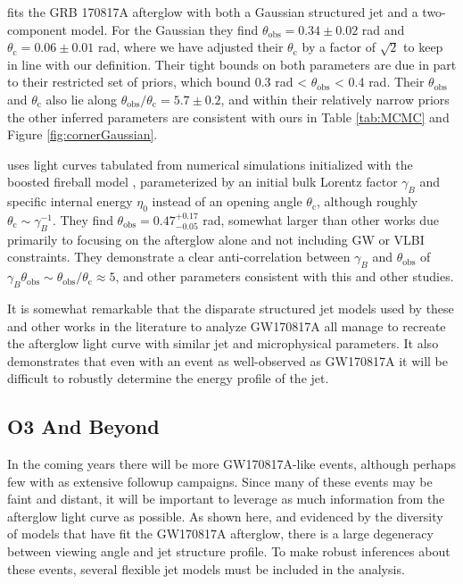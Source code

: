 \documentclass[twocolumn]{aastex62}
\newcommand{\gwbns}{GW170817A}
\newcommand{\grbbns}{GRB 170817A}
\newcommand{\thobs}{\ensuremath{\theta_{\mathrm{obs}}}}
\newcommand{\thC}{\ensuremath{\theta_{\mathrm{c}}}}
\begin{document}
\citet{Lamb:2019aa} fits the \grbbns{} afterglow with both a Gaussian structured jet and a two-component model.  For the Gaussian they find $\thobs = 0.34 \pm 0.02$ rad and $\thC = 0.06 \pm 0.01$ rad, where we have adjusted their $\thC$ by a factor of $\sqrt{2}$ to keep in line with our definition.  Their tight bounds on both parameters are due in part to their restricted set of priors, which bound 0.3 rad < $\thobs$ < 0.4 rad.  Their $\thobs$ and $\thC$ also lie along $\thobs/\thC = 5.7 \pm 0.2$, and within their relatively narrow priors the other inferred parameters are consistent with ours in Table \ref{tab:MCMC} and Figure \ref{fig:cornerGaussian}.

\citet{Wu:2018aa} uses light curves tabulated from numerical simulations initialized with the boosted fireball model \citep{Duffell:2013aa}, parameterized by an initial bulk Lorentz factor $\gamma_B$ and specific internal energy $\eta_0$ instead of an opening angle $\thC$, although roughly $\thC \sim \gamma_B^{-1}$.  They find $\thobs = 0.47^{+0.17}_{-0.05}$ rad, somewhat larger than other works due primarily to focusing on the afterglow alone and not including GW or VLBI constraints.  They demonstrate a clear anti-correlation between $\gamma_B$ and $\thobs$ of $\gamma_B \thobs  \sim \thobs/\thC \approx 5$, and other parameters consistent with this and other studies.

It is somewhat remarkable that the disparate structured jet models used by these and other works in the literature to analyze \gwbns{} all manage to recreate the afterglow light curve with similar jet and microphysical parameters.  It also demonstrates that even with an event as well-observed as \gwbns{} it will be difficult to robustly determine the energy profile of the jet.

\subsection{O3 And Beyond}

In the coming years there will be more \gwbns{}-like events, although perhaps few with as extensive followup campaigns.  Since many of these events may be faint and distant, it will be important to leverage as much information from the afterglow light curve as possible.  As shown here, and evidenced by the diversity of models that have fit the \gwbns{} afterglow, there is a large degeneracy between viewing angle and jet structure profile.  To make robust inferences about these events, several flexible jet models must be included in the analysis.  
\end{document}
